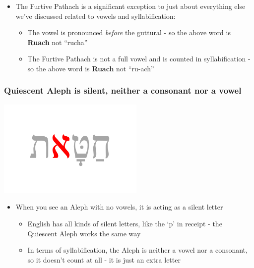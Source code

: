 \documentclass[
]{turabian-researchpaper}
\providecommand{\tightlist}{%
  \setlength{\itemsep}{0pt}\setlength{\parskip}{0pt}}
\begin{document}
\begin{itemize}
\tightlist
\item
  The Furtive Pathach is a significant exception to just about everything else we've discussed related to vowels and syllabification:

  \begin{itemize}
  \tightlist
  \item
    The vowel is pronounced \emph{before} the guttural - so the above word is \textbf{Ruach} not ``rucha''
  \item
    The Furtive Pathach is not a full vowel and is counted in syllabification - so the above word is \textbf{Ruach} not ``ru-ach''
  \end{itemize}
\end{itemize}

\hypertarget{quiescent-aleph-is-silent-neither-a-consonant-nor-a-vowel}{%
\subsubsection*{Quiescent Aleph is silent, neither a consonant nor a vowel}\label{quiescent-aleph-is-silent-neither-a-consonant-nor-a-vowel}}

\begin{center}\includegraphics[width=200pt]{images/03.quiescentaleph} \end{center}

\begin{itemize}
\tightlist
\item
  When you see an Aleph with no vowels, it is acting as a silent letter

  \begin{itemize}
  \tightlist
  \item
    English has all kinds of silent letters, like the `p' in receipt - the Quiescent Aleph works the same way
  \item
    In terms of syllabification, the Aleph is neither a vowel nor a consonant, so it doesn't count at all - it is just an extra letter
  \end{itemize}
\end{itemize}
\end{document}

